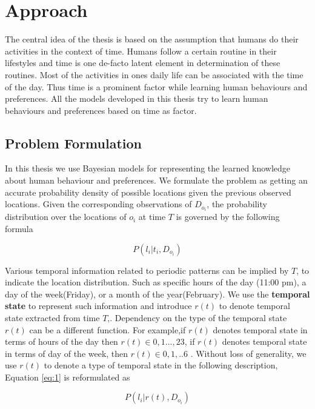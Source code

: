 
\chapter{Approach}
\label{cha:approach}

The central idea of the thesis is based on the assumption that humans do their activities in the context of time. Humans follow a certain routine in their lifestyles and time is one de-facto latent element in determination of these routines. Most of the activities in ones daily life can be associated with the time of the day. Thus time is a prominent factor while learning human behaviours and preferences. All the models developed in this thesis try to learn human behaviours and preferences based on time as factor. 

\section{Problem Formulation}
In this thesis we use Bayesian models for representing the learned knowledge about human behaviour and preferences. We formulate the problem as getting an accurate probability density of possible locations given the previous observed locations. Given the corresponding observations of $D_{o_i}$, the probability distribution over the locations of $o_i$ at time $T$ is governed by the following formula 

    \begin{equation} \label{eq:1}
	    P(l_i | t_i, D_{o_i})
    \end{equation}

   Various temporal information related to periodic patterns can be implied by $T$, to indicate the location distribution. Such as specific hours of the day (11:00 pm), a day of the week(Friday), or a month of the year(February). We use the \textbf{temporal state} to represent such information and introduce $r(t)$ to denote temporal state extracted from time $T$,.  Dependency on the type of the temporal state $r(t)$ can be a different function. For example,if $r(t)$ denotes temporal state in terms of hours of the day then $r(t) \in {0,1 ... , 23}$, if $r(t)$ denotes temporal state in terms of day of the week, then $r(t) \in {0,1, .. 6}$ . Without loss of generality, we use $r(t)$ to denote a type of temporal state in the following description, Equation \ref{eq:1} is reformulated as 
    
    \begin{equation}
	    P( l_i | r(t), D_{o_i})
    \end{equation}
    
